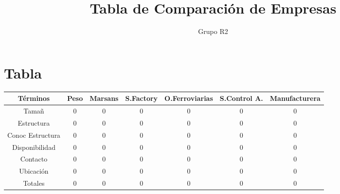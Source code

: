 \documentclass[12pt,a4paper,spanish]{article}
\begin{document}
 

\pagestyle{plain}
\title{Tabla de Comparaci\'{o}n de Empresas} 
\author{Grupo R2} 
\maketitle 
\newpage
\tableofcontents
\newpage
\section{Tabla}
\begin{center}
\begin{tabular}{|| c | c | c | c | c | c | c | |}
\hline
\hline
T\'{e}rminos & Peso & Marsans &  S.Factory & O.Ferroviarias & S.Control A. & Manufacturera\\
\hline
Tama\~{n}   & 0 & 0 & 0 & 0 & 0 & 0 \\
\hline
Estructura & 0 & 0 & 0 & 0 & 0 & 0 \\
\hline
Conoc Estructura & 0 & 0 & 0 & 0 & 0 & 0 \\
\hline
Disponibilidad  & 0 & 0 & 0 & 0 & 0 & 0 \\
\hline
Contacto   & 0 & 0 & 0 & 0 & 0 & 0 \\
\hline
Ubicaci\'{o}n & 0  & 0 & 0 & 0 & 0 & 0 \\
\hline
\hline
Totales & 0  & 0 & 0 & 0 & 0 & 0 \\
\hline

\end{tabular}
\end{center}   
\end{document}
